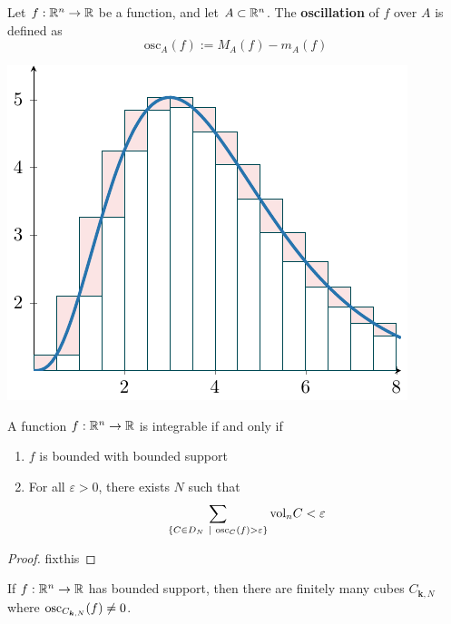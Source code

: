     \begin{definition}
    Let $f: \mathbb{R}^n \to \mathbb{R}$ be a function, and let $A \subset \mathbb{R}^n$.  The \textbf{oscillation} of $f$ over $A$ is defined as $$\text{osc}_A(f) := M_A(f) - m_A(f)$$
    \end{definition}

    \begin{center}
        \includegraphics{chapters/4-IntegrationRn/figures/figures-integraloscillation.pdf}
    \end{center}
    
    \begin{theorem}
    A function $f: \mathbb{R}^n \to \mathbb{R}$ is integrable if and only if
    \begin{enumerate}
        \item $f$ is bounded with bounded support
        \item For all $\varepsilon > 0$, there exists $N$ such that $$\sum_{\{C \in D_N \ | \ \text{osc}_C(f) > \varepsilon \}} \textnormal{vol}_n C < \varepsilon$$
    \end{enumerate}
    \end{theorem}

\begin{proof}
    fixthis
\end{proof}

\begin{proposition}
        If $f: \mathbb{R}^n \to \mathbb{R}$ has bounded support, then there are finitely many cubes $C_{\bm{k},N}$ where $\textnormal{osc}_{C_{\bm{k},N}}(f) \neq 0$.
    \end{proposition}

